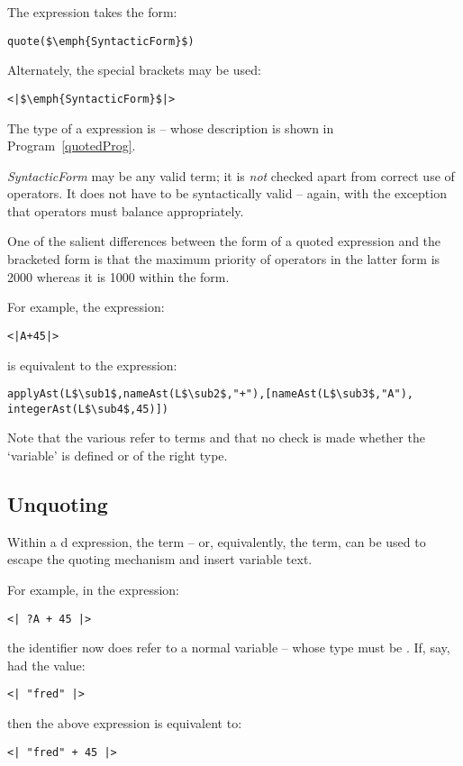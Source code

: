 The  expression takes the form:
\begin{lstlisting}[escapechar=$]
quote($\emph{SyntacticForm}$)
\end{lstlisting}
Alternately, the special \q{<|} brackets \q{|>} may be used:
\begin{lstlisting}[mathescape=true]
<|$\emph{SyntacticForm}$|>
\end{lstlisting}
The type of a  expression is  -- whose description is shown in Program~\vref{quotedProg}. 

\emph{SyntacticForm} may be any valid \Sr term; it is \emph{not} checked apart from correct use of operators. It does not have to be syntactically valid -- again, with the exception that operators must balance appropriately.
\begin{aside}
One of the salient differences between the  form of a quoted expression and the \q{<|} bracketed \q{|>} form is that the maximum priority of operators in the latter form is 2000 whereas it is 1000 within the  form.
\end{aside}

For example, the expression:
\begin{lstlisting}
<|A+45|>
\end{lstlisting}
is equivalent to the expression:
\begin{lstlisting}[mathescape=true]
applyAst(L$\sub1$,nameAst(L$\sub2$,"+"),[nameAst(L$\sub3$,"A"), integerAst(L$\sub4$,45)])
\end{lstlisting}
Note that the various  refer to  terms and that no check is made whether the `variable'  is defined or of the right type.


\subsection{Unquoting}
Within a d expression, the  term -- or, equivalently, the  term, can be used to escape the quoting mechanism and insert variable text.

For example, in the expression:
\begin{lstlisting}
<| ?A + 45 |>
\end{lstlisting}
the identifier  now does refer to a normal variable -- whose type must be . If, say,  had the value: 
\begin{lstlisting}
<| "fred" |>
\end{lstlisting}
then the above expression is equivalent to:
\begin{lstlisting}
<| "fred" + 45 |>
\end{lstlisting}

